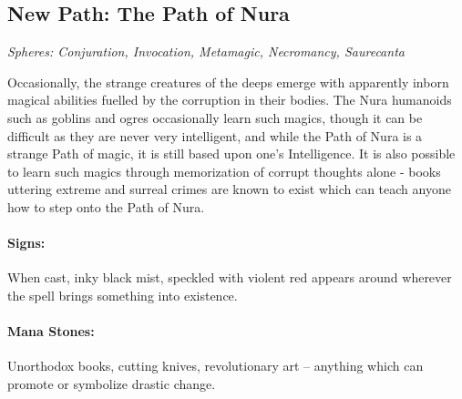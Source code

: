 \begin{multicols}{2}

\subsection{New Path: The Path of Nura}

\textit{Spheres: Conjuration, Invocation, Metamagic, Necromancy, Saurecanta}

\noindent Occasionally, the strange creatures of the deeps emerge with apparently inborn magical abilities fuelled by the corruption in their bodies.  The Nura humanoids such as goblins and ogres occasionally learn such magics, though it can be difficult as they are never very intelligent, and while the Path of Nura is a strange Path of magic, it is still based upon one's Intelligence.  It is also possible to learn such magics through memorization of corrupt thoughts alone - books uttering extreme and surreal crimes are known to exist which can teach anyone how to step onto the Path of Nura.

\paragraph{Signs:} When cast, inky black mist, speckled with violent red appears around wherever the spell brings something into existence.

\paragraph{Mana Stones:} Unorthodox books, cutting knives, revolutionary art -- anything which can promote or symbolize drastic change.

\end{multicols}



